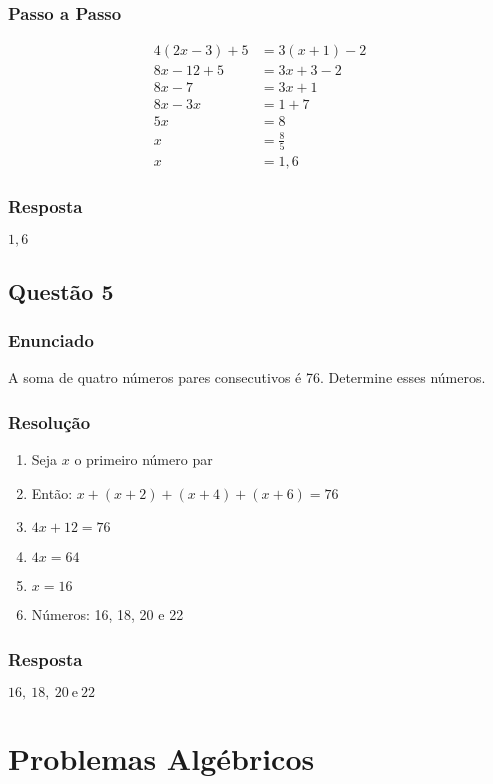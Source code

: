\documentclass[11pt]{article}
\begin{document}
\subsubsection*{Passo a Passo}
\begin{align*}
4(2x - 3) + 5 &= 3(x + 1) - 2 \\
8x - 12 + 5 &= 3x + 3 - 2 \\
8x - 7 &= 3x + 1 \\
8x - 3x &= 1 + 7 \\
5x &= 8 \\
x &= \frac{8}{5} \\
x &= 1,6
\end{align*}

\subsubsection*{Resposta}
$\boxed{1,6}$

\subsection{Questão 5}
\subsubsection*{Enunciado}
A soma de quatro números pares consecutivos é 76. Determine esses números.

\subsubsection*{Resolução}
\begin{enumerate}
\item Seja $x$ o primeiro número par
\item Então: $x + (x+2) + (x+4) + (x+6) = 76$
\item $4x + 12 = 76$
\item $4x = 64$
\item $x = 16$
\item Números: 16, 18, 20 e 22
\end{enumerate}

\subsubsection*{Resposta}
$\boxed{16,\ 18,\ 20\ \text{e}\ 22}$

\section{Problemas Algébricos}
\end{document}
